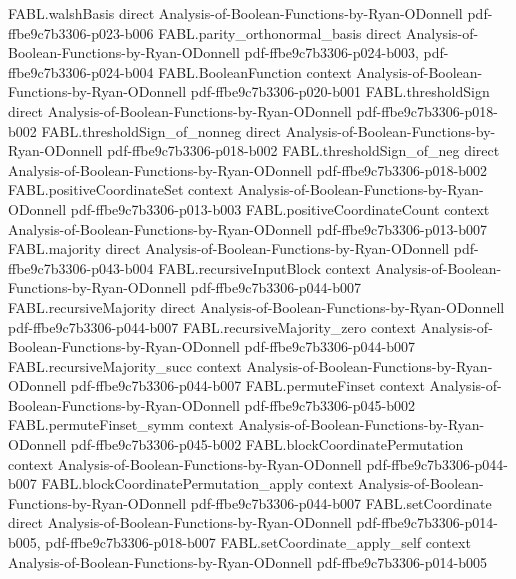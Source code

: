 \begin{theorem}
  {FABL.walshBasis}
  {direct}
  {Analysis-of-Boolean-Functions-by-Ryan-ODonnell}
  {pdf-ffbe9c7b3306-p023-b006}
\proofstep
  {FABL.parity_orthonormal_basis}
  {direct}
  {Analysis-of-Boolean-Functions-by-Ryan-ODonnell}
  {pdf-ffbe9c7b3306-p024-b003,
    pdf-ffbe9c7b3306-p024-b004}
\proofstep
  {FABL.BooleanFunction}
  {context}
  {Analysis-of-Boolean-Functions-by-Ryan-ODonnell}
  {pdf-ffbe9c7b3306-p020-b001}
\proofstep
  {FABL.thresholdSign}
  {direct}
  {Analysis-of-Boolean-Functions-by-Ryan-ODonnell}
  {pdf-ffbe9c7b3306-p018-b002}
\proofstep
  {FABL.thresholdSign_of_nonneg}
  {direct}
  {Analysis-of-Boolean-Functions-by-Ryan-ODonnell}
  {pdf-ffbe9c7b3306-p018-b002}
\proofstep
  {FABL.thresholdSign_of_neg}
  {direct}
  {Analysis-of-Boolean-Functions-by-Ryan-ODonnell}
  {pdf-ffbe9c7b3306-p018-b002}
\proofstep
  {FABL.positiveCoordinateSet}
  {context}
  {Analysis-of-Boolean-Functions-by-Ryan-ODonnell}
  {pdf-ffbe9c7b3306-p013-b003}
\proofstep
  {FABL.positiveCoordinateCount}
  {context}
  {Analysis-of-Boolean-Functions-by-Ryan-ODonnell}
  {pdf-ffbe9c7b3306-p013-b007}
\proofstep
  {FABL.majority}
  {direct}
  {Analysis-of-Boolean-Functions-by-Ryan-ODonnell}
  {pdf-ffbe9c7b3306-p043-b004}
\proofstep
  {FABL.recursiveInputBlock}
  {context}
  {Analysis-of-Boolean-Functions-by-Ryan-ODonnell}
  {pdf-ffbe9c7b3306-p044-b007}
\proofstep
  {FABL.recursiveMajority}
  {direct}
  {Analysis-of-Boolean-Functions-by-Ryan-ODonnell}
  {pdf-ffbe9c7b3306-p044-b007}
\proofstep
  {FABL.recursiveMajority_zero}
  {context}
  {Analysis-of-Boolean-Functions-by-Ryan-ODonnell}
  {pdf-ffbe9c7b3306-p044-b007}
\proofstep
  {FABL.recursiveMajority_succ}
  {context}
  {Analysis-of-Boolean-Functions-by-Ryan-ODonnell}
  {pdf-ffbe9c7b3306-p044-b007}
\proofstep
  {FABL.permuteFinset}
  {context}
  {Analysis-of-Boolean-Functions-by-Ryan-ODonnell}
  {pdf-ffbe9c7b3306-p045-b002}
\proofstep
  {FABL.permuteFinset_symm}
  {context}
  {Analysis-of-Boolean-Functions-by-Ryan-ODonnell}
  {pdf-ffbe9c7b3306-p045-b002}
\proofstep
  {FABL.blockCoordinatePermutation}
  {context}
  {Analysis-of-Boolean-Functions-by-Ryan-ODonnell}
  {pdf-ffbe9c7b3306-p044-b007}
\proofstep
  {FABL.blockCoordinatePermutation_apply}
  {context}
  {Analysis-of-Boolean-Functions-by-Ryan-ODonnell}
  {pdf-ffbe9c7b3306-p044-b007}
\proofstep
  {FABL.setCoordinate}
  {direct}
  {Analysis-of-Boolean-Functions-by-Ryan-ODonnell}
  {pdf-ffbe9c7b3306-p014-b005,
    pdf-ffbe9c7b3306-p018-b007}
\proofstep
  {FABL.setCoordinate_apply_self}
  {context}
  {Analysis-of-Boolean-Functions-by-Ryan-ODonnell}
  {pdf-ffbe9c7b3306-p014-b005}
\proofstep

\end{theorem}
